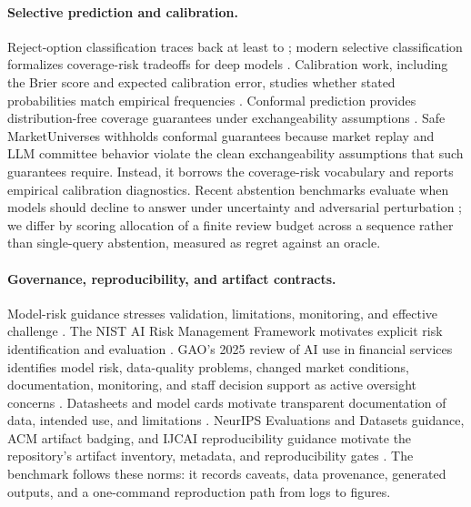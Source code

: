 \documentclass[10pt,twocolumn]{article}
\begin{document}
\paragraph{Selective prediction and calibration.}
Reject-option classification traces back at least to \citet{chow1970optimum}; modern selective classification formalizes coverage-risk tradeoffs for deep models \citep{geifman2017selective}. Calibration work, including the Brier score and expected calibration error, studies whether stated probabilities match empirical frequencies \citep{brier1950verification,guo2017calibration}. Conformal prediction provides distribution-free coverage guarantees under exchangeability assumptions \citep{shafer2008tutorial}. Safe MarketUniverses withholds conformal guarantees because market replay and LLM committee behavior violate the clean exchangeability assumptions that such guarantees require. Instead, it borrows the coverage-risk vocabulary and reports empirical calibration diagnostics. Recent abstention benchmarks evaluate when models should decline to answer under uncertainty and adversarial perturbation \citep{medabstain2026}; we differ by scoring allocation of a finite review budget across a sequence rather than single-query abstention, measured as regret against an oracle.

\paragraph{Governance, reproducibility, and artifact contracts.}
Model-risk guidance stresses validation, limitations, monitoring, and effective challenge \citep{sr1172011}. The NIST AI Risk Management Framework motivates explicit risk identification and evaluation \citep{nist2023airmf}. GAO's 2025 review of AI use in financial services identifies model risk, data-quality problems, changed market conditions, documentation, monitoring, and staff decision support as active oversight concerns \citep{gao2025aifinservices}. Datasheets and model cards motivate transparent documentation of data, intended use, and limitations \citep{gebru2021datasheets,mitchell2019modelcards}. NeurIPS Evaluations and Datasets guidance, ACM artifact badging, and IJCAI reproducibility guidance motivate the repository's artifact inventory, metadata, and reproducibility gates \citep{neuripsedfaq2026,neuripshandbook2026,acmbadging,ijcairepro2026}. The benchmark follows these norms: it records caveats, data provenance, generated outputs, and a one-command reproduction path from logs to figures.
\end{document}
